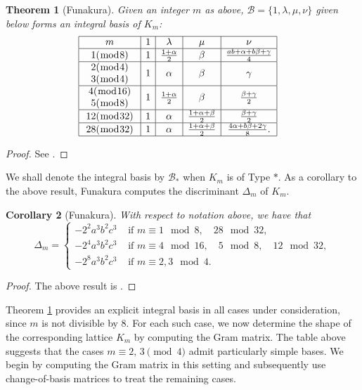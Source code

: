 \documentclass[table]{amsart}
\newtheorem{theorem}{Theorem}[section]
\newtheorem{corollary}[theorem]{Corollary}
\numberwithin{equation}{section}
\begin{document}
\begin{theorem}[Funakura]\label{IB funakura}
Given an integer $m$ as above, $\mathcal{B}=\{1,\lambda,\mu,\nu\}$ given below forms an integral basis of $K_m$:
$$
\begin{aligned}
&\begin{array}{|c|c|c|c|c|}
\hline m & 1 & \lambda & \mu & \nu \\
\hline 1(\bmod 8) & 1 & \frac{1+\alpha}{2} & \beta & \frac{a b+\alpha+b \beta+\gamma}{4} \\
\hline \begin{array}{c}
2(\bmod 4) \\
3(\bmod 4)
\end{array} & 1 & \alpha & \beta & \gamma \\
\hline \begin{array}{c}
4(\bmod 16) \\
5(\bmod 8)
\end{array} & 1 & \frac{1+\alpha}{2} & \beta & \frac{\beta+\gamma}{2} \\
\hline 12(\bmod 32) & 1 & \alpha & \frac{1+\alpha+\beta}{2} & \frac{\beta+\gamma}{2} \\
\hline 28(\bmod 32) & 1 & \alpha & \frac{1+\alpha+\beta}{2} & \frac{4 \alpha+b \beta+2 \gamma}{8} .\\
\hline
\end{array}
\end{aligned}
$$
\end{theorem}
\begin{proof}
    See \cite[Theorem 1]{Funakura}.
\end{proof}
\noindent We shall denote the integral basis by $\mathcal{B}_\ast$ when $K_m$ is of Type $\ast$. As a corollary to the above result, Funakura computes the discriminant $\Delta_m$ of $K_m$.
\begin{corollary}[Funakura]\label{funakura corollary}
    With respect to notation above, we have that
    \[\Delta_m=\begin{cases}
        -2^2a^3 b^2 c^3 &\text{ if }m\equiv 1\mod{8}, \quad 28\mod{32},\\
        -2^4a^3 b^2 c^3 &\text{ if }m\equiv 4\mod{16},\quad 5\mod{8},\quad 12\mod{32},\\
        -2^8a^3 b^2 c^3 &\text{ if }m\equiv 2,3\mod{4}.
    \end{cases}\]
\end{corollary}
\begin{proof}
    The above result is \cite[Corollary 1]{Funakura}.
\end{proof}
\par Theorem \ref{IB funakura} provides an explicit integral basis in all cases under consideration, since $m$ is not divisible by 8. For each such case, we now determine the shape of the corresponding lattice $K_m$ by computing the Gram matrix. The table above suggests that the cases $m \equiv 2,\,3 \pmod{4}$ admit particularly simple bases. We begin by computing the Gram matrix in this setting and subsequently use change-of-basis matrices to treat the remaining cases.
\end{document}
